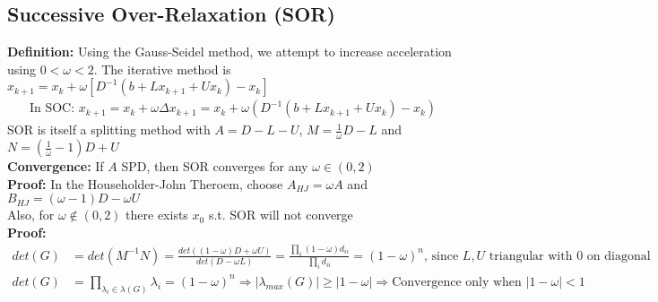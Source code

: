 \documentclass{article}
\newcommand{\abs}[1]{\lvert#1\rvert}
\begin{document}
\subsection{Successive Over-Relaxation (SOR)}
\textbf{Definition:} Using the Gauss-Seidel method, we attempt to increase acceleration using $0<\omega<2$. The  iterative method is $x_{k+1} = x_k + \omega\left[D^{-1}(b + Lx_{k+1} + Ux_k) - x_k\right]$
\begin{align*}
    \textrm{In SOC: } x_{k+1} = x_k + \omega\Delta x_{k+1} = x_k + \omega(D^{-1}(b + Lx_{k+1} + Ux_k) - x_k)
\end{align*}
SOR is itself a splitting method with $A = D - L - U$,  $M = \frac{1}{\omega}D - L$ and $N = (\frac{1}{\omega} - 1)D + U$\\
\textbf{Convergence:} If $A$ SPD, then SOR converges for any $\omega \in (0, 2)$\\
\textbf{Proof:} In the Householder-John Theroem, choose $A_{HJ} = \omega A$ and $B_{HJ} = (\omega - 1)D - \omega U$\\
Also, for $\omega \notin (0, 2)$ there exists $x_0$ s.t. SOR will not converge\\
\textbf{Proof:}
\begin{align*}
    det(G) &= det(M^{-1}N) = \frac{det((1-\omega)D + \omega U)}{det(D - \omega L)} = \frac{\prod_i(1-\omega)d_{ii}}{\prod_i d_{ii}} = (1-\omega)^n \textrm{, since $L, U$ triangular with 0 on diagonal}\\
    det(G) &= \prod_{\lambda_i \in \lambda(G)}\lambda_i = (1-\omega)^n \Longrightarrow \abs{\lambda_{max}(G)}\geq \abs{1 - \omega} \Longrightarrow \textrm{Convergence only when } \abs{1 - \omega} < 1
\end{align*}
\end{document}
